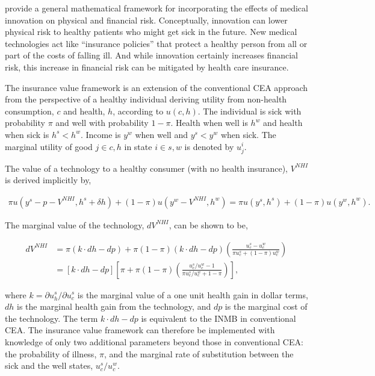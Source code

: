 \documentclass[11pt,final,fleqn]{article}
\theoremstyle{plain}
\begin{document}
\citet{lakdawalla2017insurance} provide a general mathematical framework for incorporating the effects of medical innovation on physical and financial risk. Conceptually, innovation can lower physical risk to healthy patients who might get sick in the future. New medical technologies act like ``insurance policies'' that protect a healthy person from all or part of the costs of falling ill. And while innovation certainly increases financial risk, this increase in financial risk can be mitigated by health care insurance.  

The insurance value framework is an extension of the conventional CEA approach from the perspective of a healthy individual deriving utility from non-health consumption, $c$ and health, $h$, according to $u(c,h)$. The individual is sick with probability $\pi$ and well with probability $1-\pi$.  Health when well is $h^w$ and health when sick is $h^s < h^w$. Income is $y^w$ when well and $y^s <y^w$ when sick. The marginal utility of good $j \in {c,h}$ in state $i \in {s,w}$ is denoted by $u_j^i$. 

The value of a technology to a healthy consumer (with no health insurance), $V^{NHI}$ is derived implicitly by,

\begin{align}
\pi u(y^s - p - V^{NHI}, h^s + \delta h) + (1 - \pi)u\left(y^w - V^{NHI}, h^w \right) = 
\pi u(y^s, h^s) + (1-\pi) u(y^w, h^w).
\end{align}

The marginal value of the technology, $dV^{NHI}$, can be shown to be,

\begin{align} 
dV^{NHI} &= \pi (k \cdot dh - dp) + \pi (1 - \pi)(k \cdot dh - dp)\left(\frac{u_c^s - u_c^w}{\pi u_c^s + (1-\pi)u_c^w} \right) \\
&= \left[k \cdot dh - dp\right] \left[\pi + \pi (1 - \pi)\left(\frac{u_c^s/u_c^w - 1}{\pi u_c^s/u_c^w + 1 - \pi}\right)\right],  \label{eqn:insurance-value}
\end{align}

where $k = \partial u_h^s/\partial u_c^s$ is the marginal value of a one unit health gain in dollar terms, $dh$ is the marginal health gain from the technology, and $dp$ is the marginal cost of the technology. The term $k \cdot dh - dp$ is equivalent to the INMB in conventional CEA. The insurance value framework can therefore be implemented with knowledge of only two additional parameters beyond those in conventional CEA: the probability of illness, $\pi$, and the marginal rate of substitution between the sick and the well states, $u_c^s/u_c^w$. 
\end{document}
